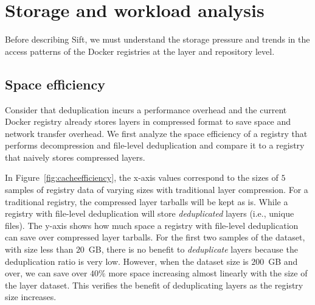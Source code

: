 \section{Storage and workload analysis}
\label{sec:dataset-analysis}

%
%

%



Before describing Sift, we must understand the storage pressure and trends in the access patterns of the Docker registries at the layer and repository level.

\subsection{Space efficiency}
Consider that deduplication incurs a performance overhead and the current Docker registry already stores layers in compressed format to save space and network transfer overhead. We first analyze the space efficiency of a registry that performs decompression and file-level deduplication and compare it to a registry that naively stores compressed layers.

In Figure~\ref{fig:cacheefficiency}, the x-axis values correspond to the sizes of $5$ samples of registry data of varying sizes with traditional layer compression. For a traditional registry, the compressed layer tarballs will be kept as is.
While a registry with file-level deduplication will store \emph{deduplicated} layers (i.e., unique files). 
The y-axis shows how much space a registry with file-level deduplication can save over compressed layer tarballs.
For the first two samples of the dataset, with size less than $20$~GB, 
there is no benefit to \emph{deduplicate} layers because the deduplication ratio is very low.
However, when the dataset size is $200$~GB and over, we can save over $40\%$ more space increasing almost linearly with the size of the layer dataset.
This verifies the benefit of deduplicating layers as the registry size increases.

